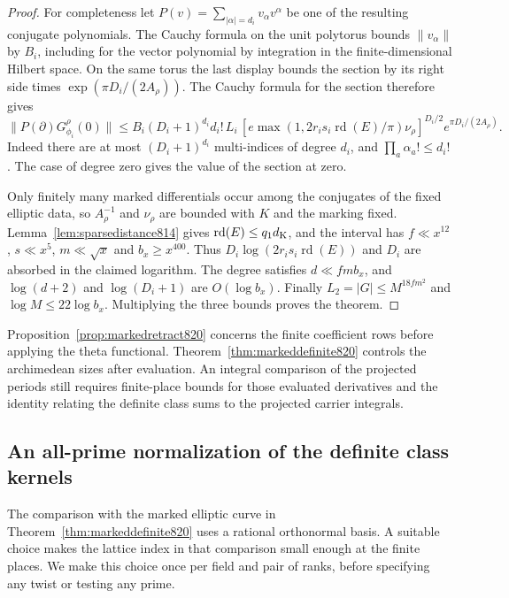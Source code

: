 \documentclass[a4paper,11pt]{article}
\theoremstyle{definition}
\theoremstyle{remark}
\numberwithin{equation}{section}
\begin{document}
\begin{proof}
For completeness let \(P(v)=\sum_{|\alpha|=d_i}v_\alpha v^\alpha\)
be one of the resulting conjugate polynomials. The Cauchy
formula on the unit polytorus bounds \(\|v_\alpha\|\) by \(B_i\),
including for the vector polynomial by integration in the
finite-dimensional Hilbert space. On the same torus the last
display bounds the section by its right side times
\(\exp(\pi D_i/(2A_\rho))\). The Cauchy formula for the
section therefore gives
\[
 \|P(\partial)G_{\phi_i}^{\rho}(0)\|
 \le B_i (D_i+1)^{d_i}d_i!\,
  L_i\,[e\max(1,2r_i s_i\operatorname{rd}(E)/\pi)\nu_\rho]^{D_i/2}
       e^{\pi D_i/(2A_\rho)} .
\]
Indeed there are at most \((D_i+1)^{d_i}\) multi-indices of
degree \(d_i\), and \(\prod_a\alpha_a!\le d_i!\).
The case of degree zero gives the value of the section at zero.

Only finitely many marked differentials occur among the conjugates
of the fixed elliptic data, so \(A_\rho^{-1}\) and \(\nu_\rho\)
are bounded with \(K\) and the marking fixed.
Lemma~\ref{lem:sparsedistance814} gives
\(\operatorname{rd}(E)\le q_1d_{\rm K}\), and the interval has
\(f\ll x^{12}\), \(s\ll x^5\), \(m\ll \sqrt{x}\) and
\(b_x\ge x^{400}\). Thus \(D_i\log(2r_is_i\operatorname{rd}(E))\)
and \(D_i\) are absorbed in the claimed logarithm.
The degree satisfies \(d\ll f m b_x\), and \(\log(d+2)\) and
\(\log(D_i+1)\) are \(O(\log b_x)\). Finally
\(L_2=|G|\le M^{18fm^2}\) and \(\log M\le22\log b_x\).
Multiplying the three bounds proves the theorem.
\end{proof}

Proposition~\ref{prop:markedretract820} concerns the finite
coefficient rows before applying the theta functional.
Theorem~\ref{thm:markeddefinite820} controls the archimedean
sizes after evaluation. An integral comparison of the projected
periods still requires finite-place bounds for those evaluated
derivatives and the identity relating the definite class sums to
the projected carrier integrals.
\clearpage

\subsection{An all-prime normalization of the definite class kernels}
\label{sec:definiteintegral821}
The comparison with the marked elliptic curve in
Theorem~\ref{thm:markeddefinite820} uses a rational orthonormal
basis. A suitable choice makes the lattice index in that
comparison small enough at the finite places. We make this
choice once per field and pair of ranks, before specifying any
twist or testing any prime.
\end{document}

